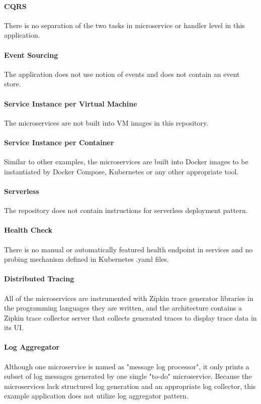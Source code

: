 \documentclass{Configuration_Files/PoliMi3i_thesis}
\begin{document}
\paragraph{CQRS} There is no separation of the two tasks in microservice or handler level in this application.

\paragraph{Event Sourcing} The application does not use notion of events and does not contain an event store.

\paragraph{Service Instance per Virtual Machine} The microservices are not built into VM images in this repository.

\paragraph{Service Instance per Container} Similar to other examples, the microservices are built into Docker images to be instantiated by Docker Compose, Kubernetes or any other appropriate tool.

\paragraph{Serverless} The repository does not contain instructions for serverless deployment pattern.

\paragraph{Health Check} There is no manual or automatically featured health endpoint in services and no probing mechanism defined in Kubernetes .yaml files.

\paragraph{Distributed Tracing} All of the microservices are instrumented with Zipkin trace generator libraries in the programming languages they are written, and the architecture contains a Zipkin trace collector server that collects generated traces to display trace data in its UI.

\paragraph{Log Aggregator} Although one microservice is named as "message log processor", it only prints a subset of log messages generated by one single "to-do" microservice.
Because the microservices lack structured log generation and an appropriate log collector, this example application does not utilize log aggregator pattern.
\end{document}
